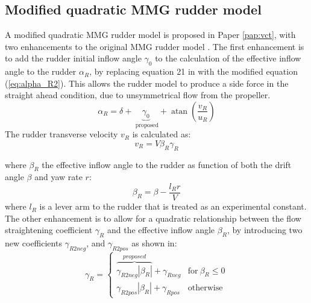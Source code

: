 \subsection{Modified quadratic MMG rudder model}
A modified quadratic MMG rudder model is proposed in Paper \ref{pap:vct}, with two enhancements to the original MMG rudder model \cite{yasukawaIntroductionMMGStandard2015}. The first enhancement is to add the rudder initial inflow angle $\gamma_0$ to the calculation of the effective inflow angle to the rudder $\alpha_R$, by replacing equation 21 in \textcite{yasukawaIntroductionMMGStandard2015} with the modified equation (\autoref{eq:alpha_R2}). This allows the rudder model to produce a side force in the straight ahead condition, due to unsymmetrical flow from the propeller. 
\begin{equation}
    \label{eq:alpha_R2}
    \alpha_{R} = \delta + \underbrace{\gamma_{0}}_{\text{ proposed}} + \operatorname{atan}{\left(\frac{v_{R}}{u_{R}} \right)}
\end{equation}
The rudder transverse velocity $v_R$ is calculated as:
\begin{equation}
    \label{eq:gamma_R2}
    v_{R} = V \beta_{R} \gamma_{R}
\end{equation}

where $\beta_R$ the effective inflow angle to the rudder as function of both the drift angle $\beta$ and yaw rate $r$:
\begin{equation}
    \label{eq:beta_R}
    \beta_{R} = \beta - \frac{l_{R} r}{V}
\end{equation}
where $l_R$ is a lever arm to the rudder that is treated as an experimental constant.
The other enhancement is to allow for a quadratic relationship between the flow straightening coefficient $\gamma_R$ and the effective inflow angle $\beta_R$, by introducing two new coefficients $\gamma_{R2neg}$, and $\gamma_{R2pos}$ as shown in:  
\begin{equation}
    \label{eq:gamma_R2}
    \gamma_{R} = \begin{cases} \overbrace{\gamma_{R2 neg} \left|{\beta_{R}}\right|}^{proposed} +   
    \gamma_{R neg} & \text{for}\: \beta_{R} \leq 0 \\\gamma_{R2 pos} \left| 
    {\beta_{R}}\right| + \gamma_{R pos} & \text{otherwise} \end{cases}
\end{equation}
\clearpage